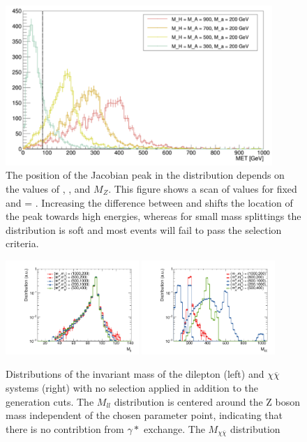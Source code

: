 \begin{figure}
\includegraphics[width=0.9\textwidth]{texinputs/04_grid/figures/monoz/leptonic/mA_Scan.pdf}
\caption{The position of the Jacobian peak in the \MET distribution depends on the values of \mH, \ma, and $M_{Z}$.  This figure shows a scan of \mH values for fixed \ma and \mA = \mH.  Increasing the difference between \mH and \ma shifts the location of the peak towards high energies, whereas for small mass splittings the \MET distribution is soft and most events will fail to pass the \MET selection criteria.}   
\label{fig:monoz_ll_mA_scan}
\end{figure}

\begin{figure}
\centering
\includegraphics[width=0.45\textwidth]{texinputs/04_grid/figures/monoz/leptonic/inclusive_h_mz_lep.pdf}
\includegraphics[width=0.45\textwidth]{texinputs/04_grid/figures/monoz/leptonic/inclusive_h_m_med_dm.pdf}
\caption{Distributions of the invariant mass of the dilepton (left) and $\chi\overline{\chi}$ systems (right) with no selection applied in addition to the generation cuts. The $M_{ll}$ distribution is centered around the Z boson mass independent of the chosen parameter point, indicating that there is no contribtion from $\gamma*$ exchange. The $M_{\chi\overline{\chi}}$ distribution }
\label{fig:monoz_kin_inclusive}
\end{figure}

